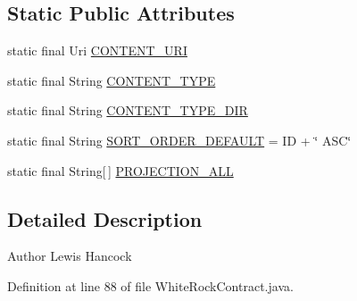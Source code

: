 \subsection*{Static Public Attributes}
\begin{DoxyCompactItemize}
\item 
static final Uri \hyperlink{classuk_1_1ac_1_1swan_1_1digitaltrails_1_1database_1_1_white_rock_contract_1_1_walk_with_english_descriptions_a94897cd53c4acae52063c420d9276d12}{C\+O\+N\+T\+E\+N\+T\+\_\+\+U\+R\+I}
\item 
static final String \hyperlink{classuk_1_1ac_1_1swan_1_1digitaltrails_1_1database_1_1_white_rock_contract_1_1_walk_with_english_descriptions_aef5d51e90a60ea15379cf7c2591de334}{C\+O\+N\+T\+E\+N\+T\+\_\+\+T\+Y\+P\+E}
\item 
static final String \hyperlink{classuk_1_1ac_1_1swan_1_1digitaltrails_1_1database_1_1_white_rock_contract_1_1_walk_with_english_descriptions_a82c01ed7f1a26f1df865a7f73f198ab1}{C\+O\+N\+T\+E\+N\+T\+\_\+\+T\+Y\+P\+E\+\_\+\+D\+I\+R}
\item 
static final String \hyperlink{classuk_1_1ac_1_1swan_1_1digitaltrails_1_1database_1_1_white_rock_contract_1_1_walk_with_english_descriptions_adc10b6bf378c040f418a9803a7afc853}{S\+O\+R\+T\+\_\+\+O\+R\+D\+E\+R\+\_\+\+D\+E\+F\+A\+U\+L\+T} = I\+D + \char`\"{} A\+S\+C\char`\"{}
\item 
static final String\mbox{[}$\,$\mbox{]} \hyperlink{classuk_1_1ac_1_1swan_1_1digitaltrails_1_1database_1_1_white_rock_contract_1_1_walk_with_english_descriptions_a61c5e01993f8185871d7be7c84aa6d52}{P\+R\+O\+J\+E\+C\+T\+I\+O\+N\+\_\+\+A\+L\+L}
\end{DoxyCompactItemize}


\subsection{Detailed Description}
\begin{DoxyAuthor}{Author}
Lewis Hancock 
\end{DoxyAuthor}


Definition at line 88 of file White\+Rock\+Contract.\+java.



